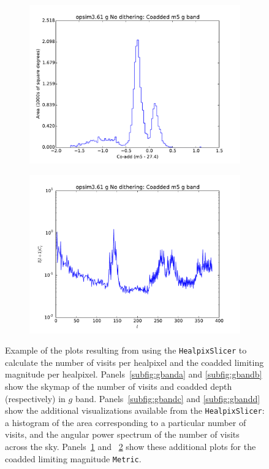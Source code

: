\documentclass[]{spie}  %
\begin{document}
\begin{figure}
\begin{center}
\begin{subfigure}[]{0.2\textwidth}
\includegraphics[width=\textwidth]{figures/opsim3_61_Coadded_m5_g_band_g_No_dithering_HEAL_Histogram}
\caption{}
\label{subfig:gbande}
\end{subfigure}
\begin{subfigure}[]{0.2\textwidth}
\includegraphics[width=\textwidth]{figures/opsim3_61_Coadded_m5_g_band_g_No_dithering_HEAL_PowerSpectrum}
\caption{}
\label{subfig:gbandf}
\end{subfigure}
\end{center}
\caption[]
{ \label{fig:gband}
Example of the plots resulting from using the {\tt HealpixSlicer} to calculate the number of visits per
healpixel and the coadded limiting magnitude per
healpixel. Panels~\ref{subfig:gbanda} and \ref{subfig:gbandb} show the
skymap of the number of visits and coadded depth (respectively) in $g$
band. Panels~\ref{subfig:gbandc} and \ref{subfig:gbandd} show the additional
visualizations available from the {\tt HealpixSlicer}: a histogram of the
area corresponding to a particular number of visits, and the angular
power spectrum of the number of visits across the
sky. Panels~\ref{subfig:gbande} and ~\ref{subfig:gbandf} show these
additional plots for the coadded limiting magnitude {\tt Metric}. 
}
\end{figure}
\end{document}
